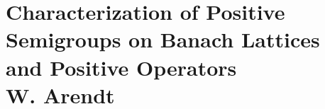 
\chapter{Characterization of Positive Semigroups on Banach Lattices and Positive Operators \\ W. Arendt}\label{chap:C-II}
